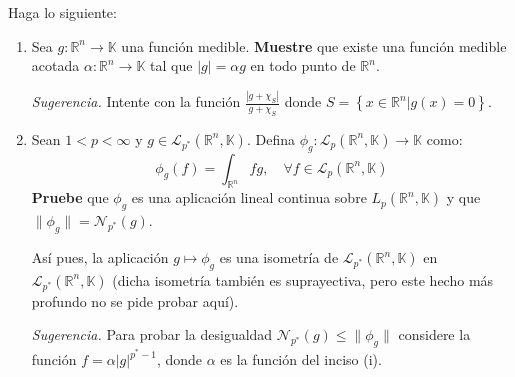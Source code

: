 \documentclass[12pt]{report}
\theoremstyle{largebreak}
\newcommand\abs[1]{\ensuremath{\left|#1\right|}}
\newcommand\cf[3]{\ensuremath{#1:#2\rightarrow#3}}
\newcommand{\N}[2]{\ensuremath{\mathcal{N}_{#1}\left(#2\right)}}
\begin{document}
    \begin{excer}
        Haga lo siguiente:
        \begin{enumerate}
            \item Sea $\cf{g}{\mathbb{R}^n}{\mathbb{K}}$ una función medible. \textbf{Muestre} que existe una función medible acotada $\cf{\alpha}{\mathbb{R}^n}{\mathbb{K}}$ tal que $\abs{g}=\alpha g$ en todo punto de $\mathbb{R}^n$.
            
            \textit{Sugerencia.} Intente con la función $\frac{\abs{g+\chi_S}}{g+\chi_S}$ donde $S=\left\{x\in\mathbb{R}^n\Big|g(x)=0 \right\}$.

            \item Sean $1<p<\infty$ y $g\in\mathcal{L}_{p^*}(\mathbb{R}^n,\mathbb{K})$. Defina $\cf{\phi_g}{\mathcal{L}_p(\mathbb{R}^n,\mathbb{K})}{\mathbb{K}}$ como:
            \begin{equation*}
                \phi_g(f)=\int_{\mathbb{R}^n}fg,\quad\forall f\in\mathcal{L}_p(\mathbb{R}^n,\mathbb{K})
            \end{equation*}
            \textbf{Pruebe} que $\phi_g$ es una aplicación lineal continua sobre $L_p(\mathbb{R}^n,\mathbb{K})$ y que $\|\phi_g\|=\N{p^*}{g}$.

            Así pues, la aplicación $g\mapsto\phi_g$ es una isometría de $\mathcal{L}_{p^*}(\mathbb{R}^n,\mathbb{K})$ en $\mathcal{L}_{p^*}(\mathbb{R}^n,\mathbb{K})$ (dicha isometría también es suprayectiva, pero este hecho más profundo no se pide probar aquí).

            \textit{Sugerencia.} Para probar la desigualdad $\N{p^*}{g}\leq\|\phi_g\|$ considere la función $f=\alpha\abs{g}^{p^*-1}$, donde $\alpha$ es la función del inciso (i).


\end{enumerate}
\end{excer}
\end{document}

